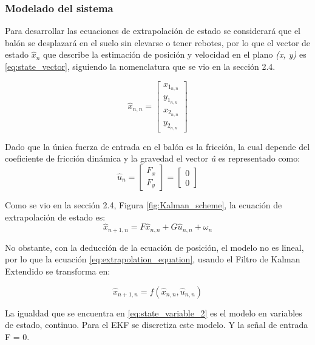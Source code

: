 		\subsubsection*{Modelado del sistema}
Para desarrollar las ecuaciones de extrapolación de estado se considerará que el balón se desplazará en el suelo sin elevarse o tener rebotes, por lo que el vector de estado $\hat{x}_n$ que describe la estimación de posición y velocidad en el plano \textit{(x, y)} es \ref{eq:state_vector}, siguiendo la nomenclatura que se vio en la sección 2.4.

\begin{equation}
\hat{x}_{n,n} = \begin{bmatrix}
x_{1_{n,n}}\\ 
y_{1_{n,n}}\\ 
x_{2_{n,n}}\\ 
y_{2_{n,n}}
\end{bmatrix}
\label{eq:state_vector}
\end{equation}

Dado que la única fuerza de entrada en el balón es la fricción, la cual depende del coeficiente de fricción dinámica y la gravedad el vector \textit{û} es representado como:
\begin{equation}
\hat{u}_n = \begin{bmatrix}
F_x\\
F_y
\end{bmatrix} = 
\begin{bmatrix}
0\\
0
\end{bmatrix}
\label{eq:input_signal}
\end{equation}


Como se vio en la sección 2.4, Figura \ref{fig:Kalman_scheme}, la ecuación de extrapolación de estado es:
\begin{equation}
\hat{x}_{n+1,n} = F \hat{x}_{n,n} + G \hat{u}_{n,n} + \omega_n
\label{eq:extrapolation_equation}
\end{equation}

No obstante, con la deducción de la ecuación de posición, el modelo no es lineal, por lo que la ecuación \ref{eq:extrapolation_equation}, usando el Filtro de Kalman Extendido se transforma en:

\begin{equation}
\hat{x}_{n+1,n} = f(\hat{x}_{n,n}, \hat{u}_{n,n}) 
\label{eq:efk}
\end{equation}


La igualdad que se encuentra en \ref{eq:state_variable_2} es el modelo en variables de estado, continuo. Para el EKF se discretiza este modelo. Y la señal de entrada F = 0. 

